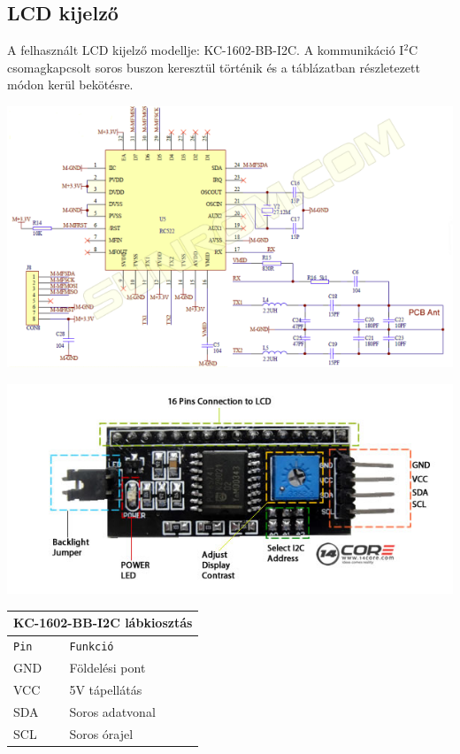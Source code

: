 \documentclass[11pt, a4paper]{article}
\begin{document}
		\subsection{LCD kijelző}
		\begin{flushleft}
			\justifying
			A felhasznált LCD kijelző modellje: KC-1602-BB-I2C. A kommunikáció I$^2$C csomagkapcsolt soros buszon keresztül történik és a táblázatban részletezett módon kerül bekötésre.
		\end{flushleft}
		\begin{minipage}{\linewidth}
			\centering
			\includegraphics[width=0.7\linewidth]{img/rc552_shematic}
			\label{fig:4lcdshematic}
		\end{minipage}
					\begin{minipage}{\linewidth}
			\centering
			\includegraphics[width=0.7\linewidth]{img/i2c_pinout}
			\label{fig:5lcdpinout}
		\end{minipage}
		\begin{minipage}{.5\textwidth}
			\fontsize{10}{16}\selectfont
			\centering
			\begin{tabular}{||m{6em} m{8em}||}
				\hline
				\multicolumn{2}{|c|}{\textbf{KC-1602-BB-I2C lábkiosztás}} \\
				\hline
				\texttt{Pin} & \texttt{Funkció} \\
				\hline\hline
				GND & Földelési pont \\ 
				\hline
				VCC & 5V tápellátás \\ 
				\hline
				SDA & Soros adatvonal \\ 
				\hline
				SCL & Soros órajel \\
				\hline
			\end{tabular}
			\label{table:lcdpinout}
		\end{minipage}
\end{document}
